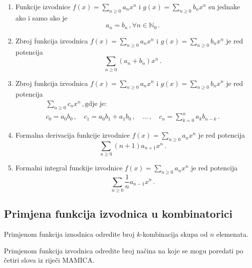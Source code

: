 \begin{enumerate}
    \item Funkcije izvodnice $f(x) = \sum_{n\geq 0}a_nx^n$ i
    $g(x) = \sum_{n\geq 0}b_nx^n$ su jednake ako i samo ako je
    $$
        a_n = b_n\,, \forall n \in \mathbb{N}_0\,.
    $$
    \item Zbroj funkcija izvodnica $f(x) = \sum_{n\geq 0} a_nx^n$ i
    $g(x) = \sum_{n\geq 0}b_nx^n$ je red potencija
    $$
        \sum_{n\geq 0} (a_n + b_n)x^n\,.
    $$
    \item Zbroj funkcija izvodnica $f(x) = \sum_{n\geq 0} a_nx^n$ i
    $g(x) = \sum_{n\geq 0}b_nx^n$ je red potencija
    \begin{align*}
        \sum_{n\geq 0} c_nx^n\,, \text{gdje je:}\\
        c_0=a_0b_0\,,\quad c_1 = a_0b_1 + a_1b_0\,,\quad \dots\,,\quad c_n = \sum_{k=0}^n a_kb_{n-k}\,.
    \end{align*}
    \item Formalna derivacija funkcije izvodnice $f(x) = \sum_{n\geq 0} a_nx^n$ je red potencija
    $$
        \sum_{n\geq 0} (n+1)a_{n+1}x^n\,.
    $$
    \item Formalni integral funckije izvodnice $f(x) = \sum_{n\geq 0} a_n x^n$ je red potencija
    $$
        \sum_{n\geq 0} \frac{1}{n} a_{n-1}x^n\,.
    $$
\end{enumerate}

\subsection{Primjena funkcija izvodnica u kombinatorici}

\begin{example}
    Primjenom funkcija iznodnica odredite broj $k$-kombinacija skupa od $n$ elemenata.
\end{example}

\begin{example}
    Primjenom funkcija izvodnica odredite broj načina na koje se mogu poredati po četiri slova iz riječi $\mathrm{MAMICA}$.
\end{example}
